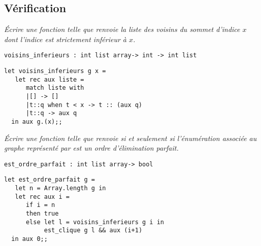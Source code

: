 \subsection{Vérification}
\begin{Exercise}\it
Écrire une fonction  telle que  renvoie la liste des voisins du sommet d'indice $x$ dont l'indice est strictement inférieur à $x$.
\end{Exercise}  
\begin{lstlisting}
voisins_inferieurs : int list array-> int -> int list
\end{lstlisting}
\begin{Answer}
\begin{lstlisting}
let voisins_inferieurs g x =
   let rec aux liste = 
      match liste with
      |[] -> []
      |t::q when t < x -> t :: (aux q)
      |t::q -> aux q
  in aux g.(x);; 
\end{lstlisting}
\end{Answer}
\begin{Exercise}\it
Écrire une fonction  telle que  renvoie  si et seulement si l'énumération associée au graphe représenté par  est un ordre d'élimination parfait.
\end{Exercise}  
\begin{lstlisting}
est_ordre_parfait : int list array-> bool
\end{lstlisting}
\begin{Answer}
\begin{lstlisting}
let est_ordre_parfait g =
   let n = Array.length g in
   let rec aux i =
      if i = n
      then true
      else let l = voisins_inferieurs g i in
           est_clique g l && aux (i+1)
  in aux 0;;
\end{lstlisting}
\end{Answer}
